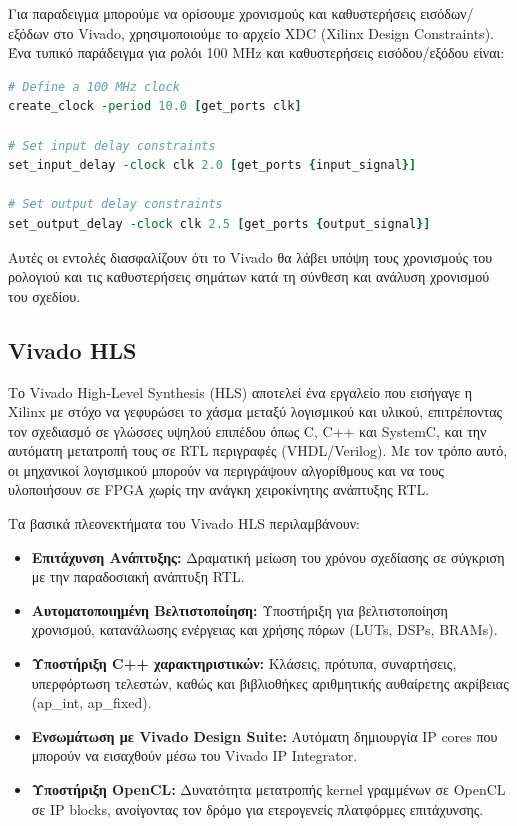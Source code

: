 Για παραδειγμα μπορούμε να ορίσουμε χρονισμούς και καθυστερήσεις εισόδων/εξόδων στο Vivado,
χρησιμοποιούμε το αρχείο XDC (Xilinx Design Constraints). Ένα τυπικό παράδειγμα για ρολόι 100 MHz και καθυστερήσεις εισόδου/εξόδου είναι:

\begin{lstlisting}[language=tcl, caption={Παράδειγμα XDC Constraints}]
# Define a 100 MHz clock
create_clock -period 10.0 [get_ports clk]

# Set input delay constraints
set_input_delay -clock clk 2.0 [get_ports {input_signal}]

# Set output delay constraints
set_output_delay -clock clk 2.5 [get_ports {output_signal}]
\end{lstlisting}

Αυτές οι εντολές διασφαλίζουν ότι το Vivado θα λάβει υπόψη τους χρονισμούς του ρολογιού και τις καθυστερήσεις σημάτων κατά τη σύνθεση και ανάλυση χρονισμού του σχεδίου.

\subsection{Vivado HLS}

Το Vivado High-Level Synthesis (HLS) αποτελεί ένα εργαλείο που εισήγαγε η Xilinx με στόχο να γεφυρώσει το χάσμα μεταξύ λογισμικού και υλικού,
επιτρέποντας τον σχεδιασμό σε γλώσσες υψηλού επιπέδου όπως C, C++ και SystemC, και την αυτόματη μετατροπή τους σε RTL περιγραφές (VHDL/Verilog).
Με τον τρόπο αυτό, οι μηχανικοί λογισμικού μπορούν να περιγράψουν αλγορίθμους και να τους υλοποιήσουν σε FPGA χωρίς την ανάγκη χειροκίνητης ανάπτυξης RTL.

Τα βασικά πλεονεκτήματα του Vivado HLS περιλαμβάνουν:
\begin{itemize}
  \item \textbf{Επιτάχυνση Ανάπτυξης:} Δραματική μείωση του χρόνου σχεδίασης σε σύγκριση με την παραδοσιακή ανάπτυξη RTL.
  \item \textbf{Αυτοματοποιημένη Βελτιστοποίηση:} Υποστήριξη για βελτιστοποίηση χρονισμού, κατανάλωσης ενέργειας και χρήσης πόρων (LUTs, DSPs, BRAMs).
  \item \textbf{Υποστήριξη C++ χαρακτηριστικών:} Κλάσεις, πρότυπα, συναρτήσεις, υπερφόρτωση τελεστών, καθώς και βιβλιοθήκες αριθμητικής αυθαίρετης ακρίβειας (ap\_int, ap\_fixed).
  \item \textbf{Ενσωμάτωση με Vivado Design Suite:} Αυτόματη δημιουργία IP cores που μπορούν να εισαχθούν μέσω του Vivado IP Integrator.
  \item \textbf{Υποστήριξη OpenCL:} Δυνατότητα μετατροπής kernel γραμμένων σε OpenCL σε IP blocks, ανοίγοντας τον δρόμο για ετερογενείς πλατφόρμες επιτάχυνσης.
\end{itemize}

